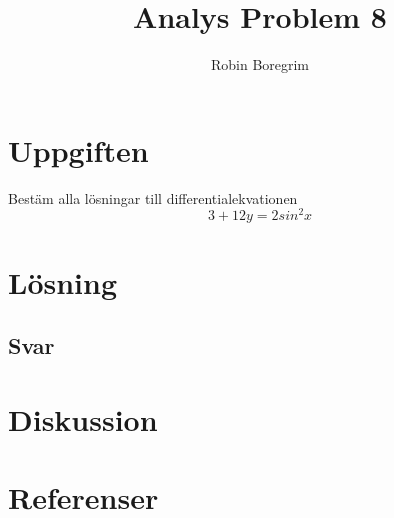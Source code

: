 \documentclass[11pt]{article}
\begin{document}
\title{Analys Problem 8}
\author{Robin Boregrim}
\maketitle
\renewcommand{\contentsname}{Innehållsförteckning}
\tableofcontents
\newpage
\section{Uppgiften}
Bestäm alla lösningar till differentialekvationen $$3 +12 y = 2sin^2x $$
\section{Lösning}
\subsection{Svar}
\section{Diskussion}
\section{Referenser}
\end{document}
